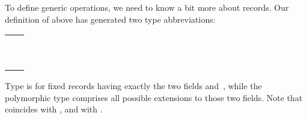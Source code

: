 \begin{isabellebody}
\begin{isamarkuptext}
  To define generic operations, we need to know a bit more about
  records.  Our definition of  above has generated two
  type abbreviations:

  \medskip
  \begin{tabular}{l}
  \isa{point}~\isa{{\isaliteral{3D}{\isacharequal}}}~\isa{{\isaliteral{5C3C6C706172723E}{\isasymlparr}}Xcoord\ {\isaliteral{3A}{\isacharcolon}}{\isaliteral{3A}{\isacharcolon}}\ int{\isaliteral{2C}{\isacharcomma}}\ Ycoord\ {\isaliteral{3A}{\isacharcolon}}{\isaliteral{3A}{\isacharcolon}}\ int{\isaliteral{5C3C72706172723E}{\isasymrparr}}} \\
  \isa{{\isaliteral{27}{\isacharprime}}a\ point{\isaliteral{5F}{\isacharunderscore}}scheme}~\isa{{\isaliteral{3D}{\isacharequal}}}~\isa{{\isaliteral{5C3C6C706172723E}{\isasymlparr}}Xcoord\ {\isaliteral{3A}{\isacharcolon}}{\isaliteral{3A}{\isacharcolon}}\ int{\isaliteral{2C}{\isacharcomma}}\ Ycoord\ {\isaliteral{3A}{\isacharcolon}}{\isaliteral{3A}{\isacharcolon}}\ int{\isaliteral{2C}{\isacharcomma}}\ {\isaliteral{5C3C646F74733E}{\isasymdots}}\ {\isaliteral{3A}{\isacharcolon}}{\isaliteral{3A}{\isacharcolon}}\ {\isaliteral{27}{\isacharprime}}a{\isaliteral{5C3C72706172723E}{\isasymrparr}}} \\
  \end{tabular}
  \medskip
  
\noindent
  Type  is for fixed records having exactly the two fields
   and~, while the polymorphic type  comprises all possible extensions to those two
  fields.  Note that  coincides with , and  with .


\end{isamarkuptext}
\end{isabellebody}

